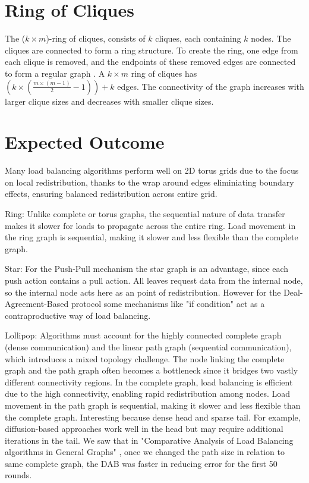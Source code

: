 \section{Ring of Cliques}\label{sec:2ringofcliquegraph}
The ($k \times m$)-ring of cliques, consists of $k$ cliques, each containing $k$ nodes. The cliques are connected to form a ring structure. To create the ring, one edge from each clique is removed, and the endpoints of these removed edges are connected to form a regular graph \cite{Mahlmann2010}. A $k \times m$ ring of cliques has $\left( k\times \left(\frac{m\times (m - 1)}{2}-1 \right) \right) +k$ edges. The connectivity of the graph increases with larger clique sizes and decreases with smaller clique sizes.

\section{Expected Outcome}\label{sec:expectedoutcome}
Many load balancing algorithms perform well on 2D torus grids due to the focus on local redistribution, thanks to the wrap around edges eliminiating boundary effects, ensuring balanced redistribution across entire grid.

Ring: Unlike complete or torus graphs, the sequential nature of data transfer makes it slower for loads to propagate across the entire ring. Load movement in the ring graph is sequential, making it slower and less flexible than the complete graph.

Star: For the Push-Pull mechanism the star graph is an advantage, since each push action contains a pull action. All leaves request data from the internal node, so the internal node acts here as an point of redistribution. However for the Deal-Agreement-Based protocol some mechanisms like "if condition" act as a contraproductive way of load balancing.

Lollipop: Algorithms must account for the highly connected complete graph (dense communication) and the linear path graph (sequential communication), which introduces a mixed topology challenge. The node linking the complete graph and the path graph often becomes a bottleneck since it bridges two vastly different connectivity regions. In the complete graph, load balancing is efficient due to the high connectivity, enabling rapid redistribution among nodes. Load movement in the path graph is sequential, making it slower and less flexible than the complete graph. Interesting because dense head and sparse tail.  For example, diffusion-based approaches work well in the head but may require additional iterations in the tail. We saw that in "Comparative Analysis of Load Balancing algorithms in General Graphs" \cite{Bayazitoglu}, once we changed the path size in relation to same complete graph, the DAB was faster in reducing error for the first 50 rounds. 

